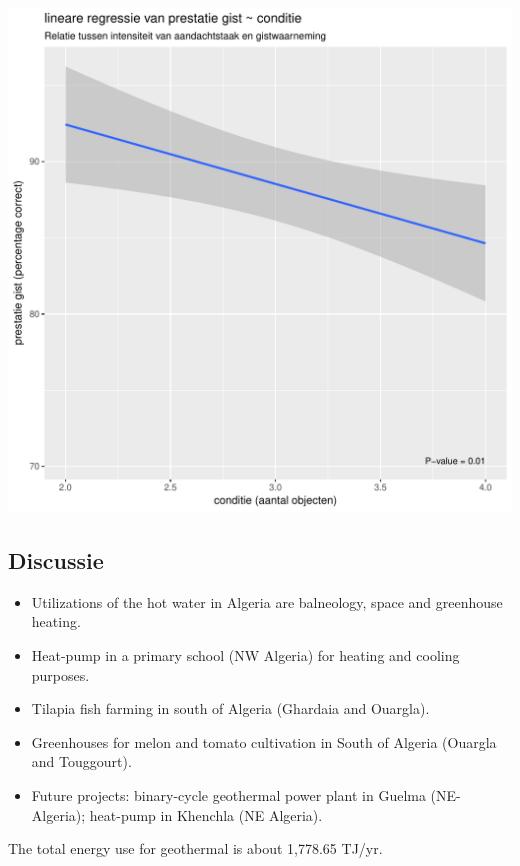 \documentclass[a0,portrait]{a0poster}
\begin{document}
\begin{multicols}{3}
\begin{center}\vspace{1cm}
\includegraphics[width=1.0\linewidth]{lineaireRegressie.pdf}
\end{center}\vspace{1cm}

\subsection*{Discussie}
\begin{itemize}
\item Utilizations of the hot water in Algeria are balneology, space and greenhouse heating. 
\item Heat-pump in a primary school (NW Algeria) for heating and cooling purposes.
\item Tilapia fish farming in south of Algeria (Ghardaia and Ouargla).
\item Greenhouses for melon and tomato cultivation in South of Algeria (Ouargla and Touggourt).
\item Future projects: binary-cycle geothermal power plant in Guelma (NE-Algeria); heat-pump in Khenchla (NE Algeria).
\end{itemize}
The total energy use for geothermal is about 1,778.65 TJ/yr.


\end{multicols}
\end{document}
